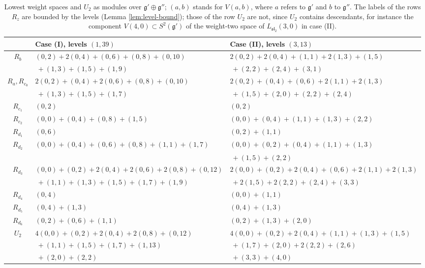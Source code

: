 \documentclass[leqno]{article}
\numberwithin{equation}{section}
\begin{document}
\begin{table}[ht]
\centering
\footnotesize
\setlength{\tabcolsep}{2.5pt}
\renewcommand{\arraystretch}{1.2}
\begin{tabular}{c|l|l}
 & Case (I), levels $(1,39)$ & Case (II), levels $(3,13)$\\
\hline
$R_b$ & $(0,2)+2(0,4)+(0,6)+(0,8)+(0,10)$ & $2(0,2)+2(0,4)+(1,1)+2(1,3)+(1,5)$\\
 & $\ +(1,3)+(1,5)+(1,9)$ & $\ +(2,2)+(2,4)+(3,1)$\\
$R_a, R_{c_0}$ & $2(0,2)+(0,4)+2(0,6)+(0,8)+(0,10)$ & $2(0,2)+(0,4)+(0,6)+2(1,1)+2(1,3)$\\
 & $\ +(1,3)+(1,5)+(1,7)$ & $\ +(1,5)+(2,0)+(2,2)+(2,4)$\\
$R_{c_1}$ & $(0,2)$ & $(0,2)$\\
$R_{c_2}$ & $(0,0)+(0,4)+(0,8)+(1,5)$ & $(0,0)+(0,4)+(1,1)+(1,3)+(2,2)$\\
$R_{d_1}$ & $(0,6)$ & $(0,2)+(1,1)$\\
$R_{d_2}$ & $(0,0)+(0,4)+(0,6)+(0,8)+(1,1)+(1,7)$ & $(0,0)+(0,2)+(0,4)+(1,1)+(1,3)$\\
 & & $\ +(1,5)+(2,2)$\\
$R_{d_3}$ & $(0,0)+(0,2)+2(0,4)+2(0,6)+2(0,8)+(0,12)$ & $2(0,0)+(0,2)+2(0,4)+(0,6)+2(1,1)+2(1,3)$\\
 & $\ +(1,1)+(1,3)+(1,5)+(1,7)+(1,9)$ & $\ +2(1,5)+2(2,2)+(2,4)+(3,3)$\\
$R_{d_4}$ & $(0,4)$ & $(0,0)+(1,1)$\\
$R_{d_5}$ & $(0,4)+(1,3)$ & $(0,4)+(1,3)$\\
$R_{d_6}$ & $(0,2)+(0,6)+(1,1)$ & $(0,2)+(1,3)+(2,0)$\\
\hline
$U_2$ & $4(0,0)+(0,2)+2(0,4)+2(0,8)+(0,12)$ & $4(0,0)+(0,2)+2(0,4)+(1,1)+(1,3)+(1,5)$\\
 & $\ +(1,1)+(1,5)+(1,7)+(1,13)$ & $\ +(1,7)+(2,0)+2(2,2)+(2,6)$\\
 & $\ +(2,0)+(2,2)$ & $\ +(3,3)+(4,0)$
\end{tabular}
\caption{Lowest weight spaces and $U_2$ as modules over $\mathfrak g' \oplus \mathfrak g''$; $(a,b)$ stands for $V(a,b)$, where $a$ refers to $\mathfrak g'$ and $b$ to $\mathfrak g''$. The labels of the rows $R_z$ are bounded by the levels (Lemma \ref{lem:level-bound}); those of the row $U_2$ are not, since $U_2$ contains descendants, for instance the component $V(4,0) \subset S^2(\mathfrak g')$ of the weight-two space of $L_{\mathfrak{sl}_2}(3,0)$ in case (II).}
\label{tab:lowest-spaces}
\end{table}
\end{document}
